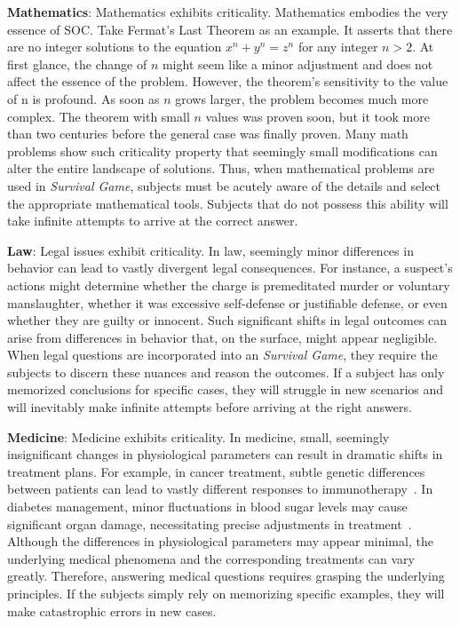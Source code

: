 \textbf{Mathematics}:
Mathematics exhibits criticality. Mathematics embodies the very essence of SOC. Take Fermat's Last Theorem as an example. It asserts that there are no integer solutions to the equation $x^n + y^n = z^n$ for any integer $n>2$. At first glance, the change of $n$ might seem like a minor adjustment and does not affect the essence of the problem. However, the theorem's sensitivity to the value of n is profound. As soon as $n$ grows larger, the problem becomes much more complex. The theorem with small $n$ values was proven soon, but it took more than two centuries before the general case was finally proven. Many math problems show such criticality property that seemingly small modifications can alter the entire landscape of solutions. Thus, when mathematical problems are used in \textit{Survival Game}, subjects must be acutely aware of the details and select the appropriate mathematical tools. Subjects that do not possess this ability will take infinite attempts to arrive at the correct answer.

\textbf{Law}:
Legal issues exhibit criticality. In law, seemingly minor differences in behavior can lead to vastly divergent legal consequences. For instance, a suspect’s actions might determine whether the charge is premeditated murder or voluntary manslaughter, whether it was excessive self-defense or justifiable defense, or even whether they are guilty or innocent. Such significant shifts in legal outcomes can arise from differences in behavior that, on the surface, might appear negligible. When legal questions are incorporated into an \textit{Survival Game}, they require the subjects to discern these nuances and reason the outcomes. If a subject has only memorized conclusions for specific cases, they will struggle in new scenarios and will inevitably make infinite attempts before arriving at the right answers.


\textbf{Medicine}:
Medicine exhibits criticality. In medicine, small, seemingly insignificant changes in physiological parameters can result in dramatic shifts in treatment plans. For example, in cancer treatment, subtle genetic differences between patients can lead to vastly different responses to immunotherapy~\citep{hwang2020immune, martinez2023genetic}. In diabetes management, minor fluctuations in blood sugar levels may cause significant organ damage, necessitating precise adjustments in treatment~\citep{zhang2019molecular}. 
Although the differences in physiological parameters may appear minimal, the underlying medical phenomena and the corresponding treatments can vary greatly. Therefore, answering medical questions requires grasping the underlying principles. If the subjects simply rely on memorizing specific examples, they will make catastrophic errors in new cases.

